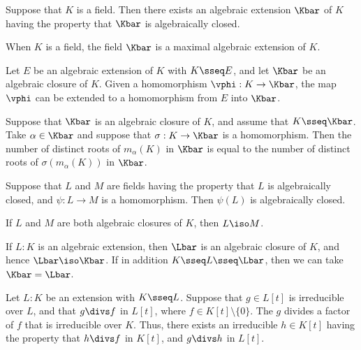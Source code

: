 \documentclass{article}
\begin{document}
  \begin{ttheorem}
    Suppose that \( K \) is a field. Then there exists an algebraic extension \( \Kbar \) of \( K \) having the property that \( \Kbar \) is algebraically closed.
  \end{ttheorem}

  \begin{tcorollary}
    When \( K \) is a field, the field \( \Kbar \) is a maximal algebraic extension of \( K \).
  \end{tcorollary}

  \begin{ttheorem}
    Let \( E \) be an algebraic extension of \( K \) with \( K\sseq E \), and let \( \Kbar \) be an algebraic closure of \( K \). Given a homomorphism \( \vphi:K\to \Kbar \), the map \( \vphi \) can be extended to a homomorphism from \( E \) into \( \Kbar \).
  \end{ttheorem}

  \begin{tcorollary}
    Suppose that \( \Kbar \) is an algebraic closure of \( K \), and assume that \( K\sseq \Kbar \). Take \( \alpha\in \Kbar \) and suppose that \( \sigma:K\to \Kbar \) is a homomorphism. Then the number of distinct roots of \( m_\alpha(K) \) in \( \Kbar \) is equal to the number of distinct roots of \( \sigma(m_\alpha(K)) \) in \( \Kbar \).
  \end{tcorollary}

  \begin{tproposition}
    Suppose that \( L \) and \( M \) are fields having the property that \( L \) is algebraically closed, and \( \psi : L \to M \) is a homomorphism. Then \( \psi(L) \) is algebraically closed.
  \end{tproposition}

  \begin{tproposition}
    If \( L \) and \( M \) are both algebraic closures of \( K \), then \( L \iso M \).
  \end{tproposition}

  \begin{tproposition}
    If \( L:K \) is an algebraic extension, then \( \Lbar \) is an algebraic closure of \( K \), and hence \( \Lbar\iso\Kbar \). If in addition \( K\sseq L\sseq \Lbar \), then we can take \( \Kbar = \Lbar \).
  \end{tproposition}

  \begin{tproposition}
    Let \( L:K \) be an extension with \( K\sseq L \). Suppose that \( g\in L[t] \) is irreducible over \( L \), and that \( g\divs f \) in \( L[t] \), where \( f\in K[t]\setminus \{ 0 \} \). The \( g \) divides a factor of \( f \) that is irreducible over \( K \). Thus, there exists an irreducible \( h\in K[t] \) having the property that \( h\divs f \) in \( K[t] \), and \( g\divs h \) in \( L[t] \).
  \end{tproposition}
\end{document}
